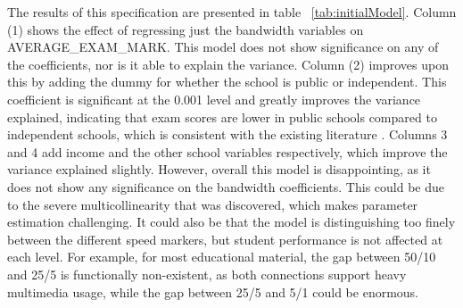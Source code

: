 \documentclass[stu, floatsintext]{apa7}
\begin{document}
    The results of this specification are presented in table ~\ref{tab:initialModel}. Column (1) shows the effect of regressing just the bandwidth variables on AVERAGE\_EXAM\_MARK. This model does not show significance on any of the coefficients, nor is it able to explain the variance. Column (2) improves upon this by adding the dummy for whether the school is public or independent. This coefficient is significant at the 0.001 level and greatly improves the variance explained, indicating that exam scores are lower in public schools compared to independent schools, which is consistent with the existing literature \autocite{Coleman1982, HOROWITZ2005189}. Columns 3 and 4 add income and the other school variables respectively, which improve the variance explained slightly. However, overall this model is disappointing, as it does not show any significance on the bandwidth coefficients. This could be due to the severe multicollinearity that was discovered, which makes parameter estimation challenging. It could also be that the model is distinguishing too finely between the different speed markers, but student performance is not affected at each level. For example, for most educational material, the gap between 50/10 and 25/5 is functionally non-existent, as both connections support heavy multimedia usage, while the gap between 25/5 and 5/1 could be enormous. 
\end{document}
